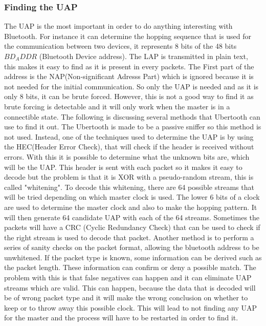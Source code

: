 \subsubsection{Finding the UAP}
\label{subsubsec:finding_uap}
The UAP is the most important in order to do anything interesting with Bluetooth. For instance it can determine the hopping sequence that is used for the communication between two devices, it represents 8 bits of the 48 bits $BD_ADDR$ (Bluetooth Device address). The LAP is transmitted in plain text, this makes it easy to find as it is present in every packets. The First part of the address is the NAP(Non-significant Adresss Part) which is ignored because it is not needed for the initial communication. So only the UAP is needed and as it is only 8 bits, it can be brute forced. However, this is not a good way to find it as brute forcing is detectable and it will only work when the master is in a connectible state. The following is discussing several methods that Ubertooth can use to find it out.\pend
The Ubertooth is made to be a passive sniffer so this method is not used. Instead, one of the techniques used to determine the UAP is by using the HEC(Header Error Check), that will check if the header is received without errors. With this it is possible to determine what the unknown bits are, which will be the UAP. This header is sent with each packet so it makes it easy to decode but the problem is that it is XOR with a pseudo-random stream, this is called "whitening". 
To decode this whitening, there are 64 possible streams that will be tried depending on which master clock is used. 
\newpage
\noindent The lower 6 bits of a clock are used to determine the master clock and also to make the hopping pattern. It will then generate 64 candidate UAP with each of the 64 streams. Sometimes the packets will have a CRC (Cyclic Redundancy Check) that can be used to check if the right stream is used to decode that packet. \pend
Another method is to perform a series of sanity checks on the packet format, allowing the bluetooth address to be unwhitened. If the packet type is known, some information can be derived such as the packet length. These information can confirm or deny a possible match. The problem with this is that false negatives can happen and it can eliminate UAP streams which are valid. This can happen, because the data that is decoded will be of wrong packet type and it will make the wrong conclusion on whether to keep or to throw away this possible clock. This will lead to not finding any UAP for the master and the process will have to be restarted in order to find it. \pend